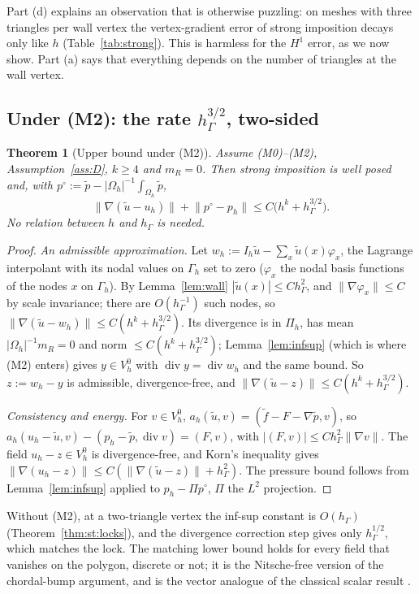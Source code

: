 \documentclass[pdflatex,sn-mathphys-num]{sn-jnl}
\theoremstyle{thmstyleone}
\newtheorem{theorem}{Theorem}[section]
\theoremstyle{thmstylethree}
\newcommand{\hG}{h_\Gamma}
\newcommand{\Gh}{\Gamma_h}
\newcommand{\Oh}{\Omega_h}
\newcommand{\VO}{V_h^0}
\newcommand{\Pih}{\Pi_h}
\newcommand{\ut}{\tilde u}
\newcommand{\pt}{\tilde p}
\newcommand{\ft}{\tilde f}
\newcommand{\norm}[1]{\lVert #1\rVert}
\renewcommand{\div}{\operatorname{div}}
\begin{document}
Part (d) explains an observation that is otherwise puzzling: on meshes with three triangles per wall vertex the vertex-gradient error of strong imposition decays only like $h$ (Table~\ref{tab:strong}). This is harmless for the $H^1$ error, as we now show. Part (a) says that everything depends on the number of triangles at the wall vertex.

\subsection{Under (M2): the rate \texorpdfstring{$\hG^{3/2}$}{h^(3/2)}, two-sided}

\begin{theorem}[Upper bound under (M2)]\label{thm:st:up}
Assume (M0)--(M2), Assumption~\ref{ass:D}, $k\ge4$ and $m_R=0$. Then strong imposition is well posed and, with $p^\circ:=\pt-|\Oh|^{-1}\int_{\Oh}\pt$,
\[
\norm{\nabla(\ut-u_h)}+\norm{p^\circ-p_h}\le C\bigl(h^k+\hG^{3/2}\bigr).
\]
No relation between $h$ and $\hG$ is needed.
\end{theorem}

\begin{proof}
\emph{An admissible approximation.} Let $w_h:=I_h\ut-\sum_x\ut(x)\varphi_x$, the Lagrange interpolant with its nodal values on $\Gh$ set to zero ($\varphi_x$ the nodal basis functions of the nodes $x$ on $\Gh$). By Lemma~\ref{lem:wall} $|\ut(x)|\le C\hG^2$, and $\norm{\nabla\varphi_x}\le C$ by scale invariance; there are $O(\hG^{-1})$ such nodes, so $\norm{\nabla(\ut-w_h)}\le C(h^k+\hG^{3/2})$. Its divergence is in $\Pih$, has mean $|\Oh|^{-1}m_R=0$ and norm $\le C(h^k+\hG^{3/2})$; Lemma~\ref{lem:infsup} (which is where (M2) enters) gives $y\in\VO$ with $\div y=\div w_h$ and the same bound. So $z:=w_h-y$ is admissible, divergence-free, and $\norm{\nabla(\ut-z)}\le C(h^k+\hG^{3/2})$.

\emph{Consistency and energy.} For $v\in\VO$, $a_h(\ut,v)=(\ft-F-\nabla\pt,v)$, so $a_h(u_h-\ut,v)-(p_h-\pt,\div v)=(F,v)$, with $|(F,v)|\le C\hG^2\norm{\nabla v}$. The field $u_h-z\in\VO$ is divergence-free, and Korn's inequality gives $\norm{\nabla(u_h-z)}\le C(\norm{\nabla(\ut-z)}+\hG^2)$. The pressure bound follows from Lemma~\ref{lem:infsup} applied to $p_h-\Pi p^\circ$, $\Pi$ the $L^2$ projection.
\end{proof}

Without (M2), at a two-triangle vertex the inf-sup constant is $O(\hG)$ (Theorem~\ref{thm:st:locks}), and the divergence correction step gives only $\hG^{1/2}$, which matches the lock. The matching lower bound holds for every field that vanishes on the polygon, discrete or not; it is the Nitsche-free version of the chordal-bump argument, and is the vector analogue of the classical scalar result \cite{BergerScottStrang1972,Scott1975}.
\end{document}
